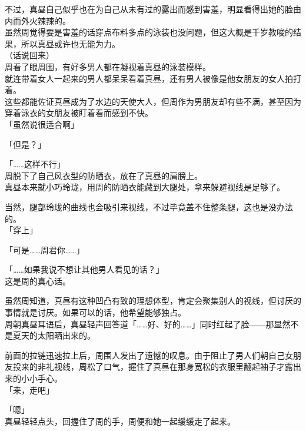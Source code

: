 不过，真昼自己似乎也在为自己从未有过的露出而感到害羞，明显看得出她的脸由内而外火辣辣的。\\

虽然周觉得要是害羞的话穿点布料多点的泳装也没问题，但这大概是千岁教唆的结果，所以真昼或许也无能为力。\\

（话说回来）\\

周看了眼周围，有好多男人都在凝视着真昼的泳装模样。\\

就连带着女人一起来的男人都呆呆看着真昼，还有男人被像是他女朋友的女人拍打着。\\

这些都能佐证真昼成为了水边的天使大人，但周作为男朋友却有些不满，甚至因为穿着泳衣的女朋友被盯着看而感到不快。\\

「虽然说很适合啊」

「但是？」

「……这样不行」\\

周脱下了自己风衣型的防晒衣，放在了真昼的肩膀上。\\

真昼本来就小巧玲珑，用周的防晒衣能藏到大腿处，拿来躲避视线是足够了。

当然，腿部玲珑的曲线也会吸引来视线，不过毕竟盖不住整条腿，这也是没办法的。\\

「穿上」

「可是……周君你……」

「……如果我说不想让其他男人看见的话？」\\

这是周的真心话。

虽然周知道，真昼有这种凹凸有致的理想体型，肯定会聚集别人的视线，但讨厌的事情就是讨厌。如果可以的话，他希望能够独占。\\

周朝真昼耳语后，真昼轻声回答道「……好、好的……」同时红起了脸——那显然不是夏天的太阳晒出来的。

前面的拉链迅速拉上后，周围人发出了遗憾的叹息。由于阻止了男人们朝自己女朋友投来的非礼视线，周松了口气，握住了真昼在那身宽松的衣服里翻起袖子才露出来的小小手心。\\

「来，走吧」

「嗯」\\

真昼轻轻点头，回握住了周的手，周便和她一起缓缓走了起来。

